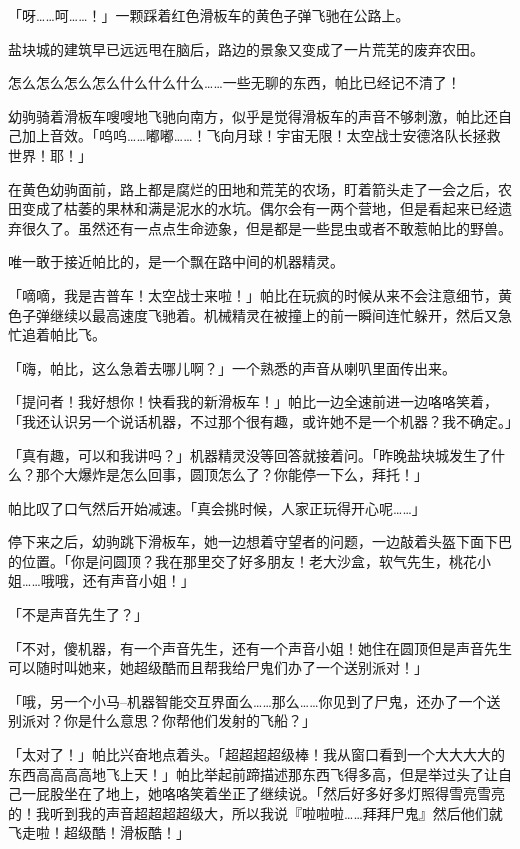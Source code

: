 「呀……呵……！」一颗踩着红色滑板车的黄色子弹飞驰在公路上。

盐块城的建筑早已远远甩在脑后，路边的景象又变成了一片荒芜的废弃农田。


怎么怎么怎么怎么什么什么什么……一些无聊的东西，帕比已经记不清了！

幼驹骑着滑板车嗖嗖地飞驰向南方，似乎是觉得滑板车的声音不够刺激，帕比还自己加上音效。「呜呜……嘟嘟……！飞向月球！宇宙无限！太空战士安德洛队长拯救世界！耶！」

在黄色幼驹面前，路上都是腐烂的田地和荒芜的农场，盯着箭头走了一会之后，农田变成了枯萎的果林和满是泥水的水坑。偶尔会有一两个营地，但是看起来已经遗弃很久了。虽然还有一点点生命迹象，但是都是一些昆虫或者不敢惹帕比的野兽。

唯一敢于接近帕比的，是一个飘在路中间的机器精灵。

「嘀嘀，我是吉普车！太空战士来啦！」帕比在玩疯的时候从来不会注意细节，黄色子弹继续以最高速度飞驰着。机械精灵在被撞上的前一瞬间连忙躲开，然后又急忙追着帕比飞。

「嗨，帕比，这么急着去哪儿啊？」一个熟悉的声音从喇叭里面传出来。

「提问者！我好想你！快看我的新滑板车！」帕比一边全速前进一边咯咯笑着，「我还认识另一个说话机器，不过那个很有趣，或许她不是一个机器？我不确定。」

「真有趣，可以和我讲吗？」机器精灵没等回答就接着问。「昨晚盐块城发生了什么？那个大爆炸是怎么回事，圆顶怎么了？你能停一下么，拜托！」

帕比叹了口气然后开始减速。「真会挑时候，人家正玩得开心呢……」

停下来之后，幼驹跳下滑板车，她一边想着守望者的问题，一边敲着头盔下面下巴的位置。「你是问圆顶？我在那里交了好多朋友！老大沙盒，软气先生，桃花小姐……哦哦，还有声音小姐！」

「不是声音先生了？」

「不对，傻机器，有一个声音先生，还有一个声音小姐！她住在圆顶但是声音先生可以随时叫她来，她超级酷而且帮我给尸鬼们办了一个送别派对！」

「哦，另一个小马--机器智能交互界面么……那么……你见到了尸鬼，还办了一个送别派对？你是什么意思？你帮他们发射的飞船？」

「太对了！」帕比兴奋地点着头。「超超超超级棒！我从窗口看到一个大大大大的东西高高高高地飞上天！」帕比举起前蹄描述那东西飞得多高，但是举过头了让自己一屁股坐在了地上，她咯咯笑着坐正了继续说。「然后好多好多灯照得雪亮雪亮的！我听到我的声音超超超超级大，所以我说『啦啦啦……拜拜尸鬼』然后他们就飞走啦！超级酷！滑板酷！」

